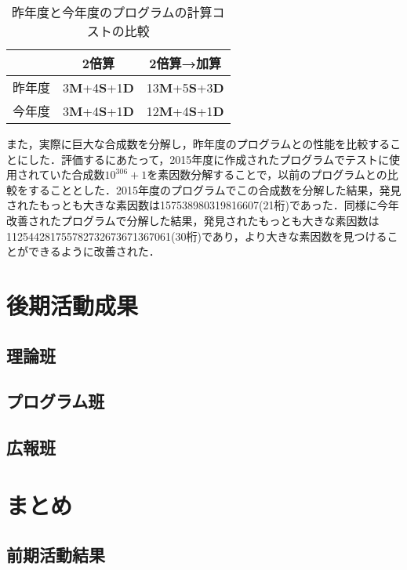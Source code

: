 \documentclass[openany,11pt,papersize]{jsbook}
\begin{document}
\begin{table}
\begin{center}
\caption{昨年度と今年度のプログラムの計算コストの比較}\label{tab:cost}
\begin{tabular}{ccc}
\hline
& 2倍算 & 2倍算→加算\\
\hline
昨年度 & 3{\bf M}+4{\bf S}+1{\bf D}\footnotemark & 13{\bf M}+5{\bf S}+3{\bf D}\\
今年度 & 3{\bf M}+4{\bf S}+1{\bf D} & 12{\bf M}+4{\bf S}+1{\bf D}\\
\hline
\end{tabular}
\end{center}
\end{table}

また，実際に巨大な合成数を分解し，昨年度のプログラムとの性能を比較することにした．評価するにあたって，2015年度に作成されたプログラムでテストに使用されていた合成数$10^{306}+1$を素因数分解することで，以前のプログラムとの比較をすることとした．2015年度のプログラムでこの合成数を分解した結果，発見されたもっとも大きな素因数は157538980319816607(21桁)であった．同様に今年改善されたプログラムで分解した結果，発見されたもっとも大きな素因数は112544281755782732673671367061(30桁)であり，より大きな素因数を見つけることができるように改善された．


\chapter{後期活動成果}
\section{理論班}

\section{プログラム班}

\section{広報班}

\chapter{まとめ}

\section{前期活動結果}
\end{document}

